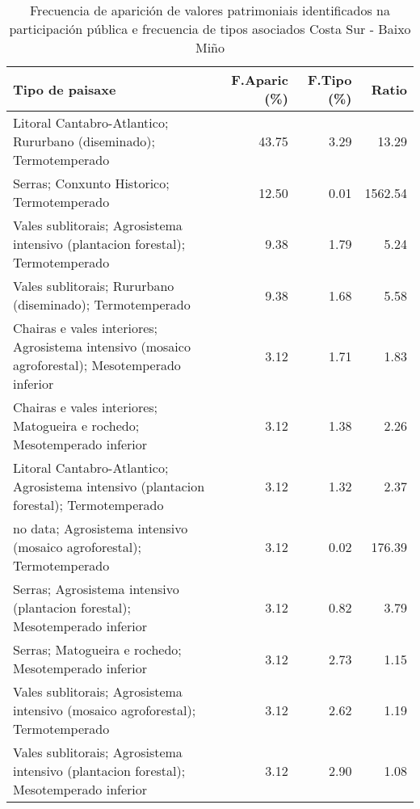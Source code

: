 \begin{table}[p]
\centering
\caption{Frecuencia de aparición de valores patrimoniais identificados na participación pública e frecuencia de tipos asociados Costa Sur - Baixo Miño} 
\label{vsixotpat3}
\begin{tabular}{lrrr}
  \hline
Tipo de paisaxe & F.Aparic (\%) & F.Tipo (\%) & Ratio \\ 
  \hline
Litoral Cantabro-Atlantico; Rururbano (diseminado); Termotemperado & 43.75 & 3.29 & 13.29 \\ 
  Serras; Conxunto Historico; Termotemperado & 12.50 & 0.01 & 1562.54 \\ 
  Vales sublitorais; Agrosistema intensivo (plantacion forestal); Termotemperado & 9.38 & 1.79 & 5.24 \\ 
  Vales sublitorais; Rururbano (diseminado); Termotemperado & 9.38 & 1.68 & 5.58 \\ 
  Chairas e vales interiores; Agrosistema intensivo (mosaico agroforestal); Mesotemperado inferior & 3.12 & 1.71 & 1.83 \\ 
  Chairas e vales interiores; Matogueira e rochedo; Mesotemperado inferior & 3.12 & 1.38 & 2.26 \\ 
  Litoral Cantabro-Atlantico; Agrosistema intensivo (plantacion forestal); Termotemperado & 3.12 & 1.32 & 2.37 \\ 
  no data; Agrosistema intensivo (mosaico agroforestal); Termotemperado & 3.12 & 0.02 & 176.39 \\ 
  Serras; Agrosistema intensivo (plantacion forestal); Mesotemperado inferior & 3.12 & 0.82 & 3.79 \\ 
  Serras; Matogueira e rochedo; Mesotemperado inferior & 3.12 & 2.73 & 1.15 \\ 
  Vales sublitorais; Agrosistema intensivo (mosaico agroforestal); Termotemperado & 3.12 & 2.62 & 1.19 \\ 
  Vales sublitorais; Agrosistema intensivo (plantacion forestal); Mesotemperado inferior & 3.12 & 2.90 & 1.08 \\ 
   \hline
\end{tabular}
\end{table}
